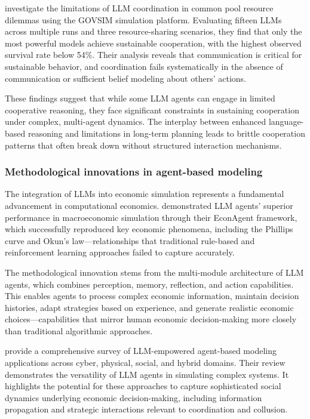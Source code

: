 \textcite{piatti_cooperate_2025} investigate the limitations of LLM coordination in common pool resource dilemmas using the GOVSIM simulation platform. Evaluating fifteen LLMs across multiple runs and three resource-sharing scenarios, they find that only the most powerful models achieve sustainable cooperation, with the highest observed survival rate below 54\%. Their analysis reveals that communication is critical for sustainable behavior, and coordination fails systematically in the absence of communication or sufficient belief modeling about others' actions.

These findings suggest that while some LLM agents can engage in limited cooperative reasoning, they face significant constraints in sustaining cooperation under complex, multi-agent dynamics. The interplay between enhanced language-based reasoning and limitations in long-term planning leads to brittle cooperation patterns that often break down without structured interaction mechanisms.


\subsubsection*{Methodological innovations in agent-based modeling}

The integration of LLMs into economic simulation represents a fundamental advancement in computational economics. \textcite{li_econagent_2024, li_large_2023} demonstrated LLM agents' superior performance in macroeconomic simulation through their EconAgent framework, which successfully reproduced key economic phenomena, including the Phillips curve and Okun's law---relationships that traditional rule-based and reinforcement learning approaches failed to capture accurately.

The methodological innovation stems from the multi-module architecture of LLM agents, which combines perception, memory, reflection, and action capabilities. This enables agents to process complex economic information, maintain decision histories, adapt strategies based on experience, and generate realistic economic choices---capabilities that mirror human economic decision-making more closely than traditional algorithmic approaches.

\textcite{gao_large_2024} provide a comprehensive survey of LLM-empowered agent-based modeling applications across cyber, physical, social, and hybrid domains. Their review demonstrates the versatility of LLM agents in simulating complex systems. It highlights the potential for these approaches to capture sophisticated social dynamics underlying economic decision-making, including information propagation and strategic interactions relevant to coordination and collusion.

